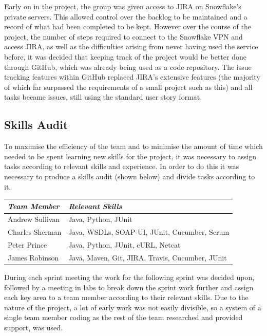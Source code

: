 \documentclass[a4paper, 12pt, twoside]{article}
\begin{document}
Early on in the project, the group was given access to JIRA on Snowflake's private servers. This allowed control over the backlog to be maintained and a record of what had been completed to be kept. However over the course of the project, the number of steps required to connect to the Snowflake VPN and access JIRA, as well as the difficulties arising from never having used the service before, it was decided that keeping track of the project would be better done through GitHub, which was already being used as a code repository. The issue tracking features within GitHub replaced JIRA's extensive features (the majority of which far surpassed the requirements of a small project such as this) and all tasks became issues, still using the standard user story format.

\subsection{Skills Audit}
\label{sec:plan_skills_audit}
To maximise the efficiency of the team and to minimise the amount of time which needed to be spent learning new skills for the project, it was necessary to assign tasks according to relevant skills and experience. In order to do this it was necessary to produce a skills audit (shown below) and divide tasks according to it.

\begin{table}[h]
\begin{tabular}{|l|l|}
\hline
\emph{Team Member} & \emph{Relevant Skills}                           \\ \hline
Andrew Sullivan    & Java, Python, JUnit                              \\ \hline
Charles Sherman    & Java, WSDLs, SOAP-UI, JUnit, Cucumber, Scrum     \\ \hline
Peter Prince       & Java, Python, JUnit, cURL, Netcat                \\ \hline
James Robinson     & Java, Maven, Git, JIRA, Travis, Cucumber, JUnit  \\ \hline
\end{tabular}
\end{table}

During each sprint meeting the work for the following sprint was decided upon, followed by a meeting in labs to break down the sprint work further and assign each key area to a team member according to their relevant skills. Due to the nature of the project, a lot of early work was not easily divisible, so a system of a single team member coding as the rest of the team researched and provided support, was used.
\end{document}
